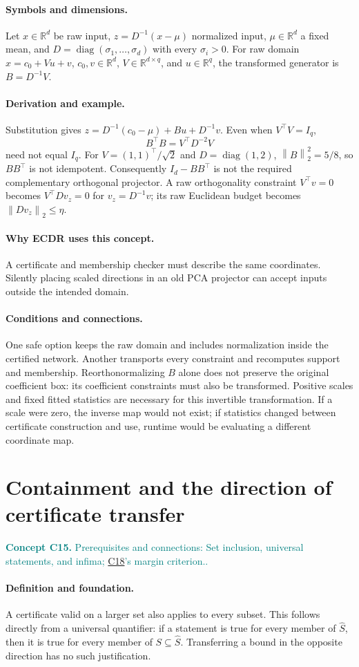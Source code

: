 \documentclass[11pt,a4paper]{article}
\newcommand{\R}{\mathbb R}
\newcommand{\norm}[1]{\left\lVert#1\right\rVert}
\newcommand{\diag}{\operatorname{diag}}
\newcommand{\conceptid}{Front matter}
\newcommand{\concept}[3]{\clearpage\renewcommand{\conceptid}{#1}%
\section{#2}\label{concept:#1}%
\textcolor{teal}{\textbf{Concept #1.} Prerequisites and connections: #3.}\par
\typeout{ECDR-CONCEPT-START #1 PAGE=\thepage}}
\begin{document}
\paragraph{Symbols and dimensions.}
Let $x\in\R^d$ be raw input, $z=D^{-1}(x-\mu)$ normalized input, $\mu\in\R^d$ a fixed mean, and $D=\diag(\sigma_1,\ldots,\sigma_d)$ with every $\sigma_i>0$. For raw domain $x=c_0+Vu+v$, $c_0,v\in\R^d$, $V\in\R^{d\times q}$, and $u\in\R^q$, the transformed generator is $B=D^{-1}V$.
\paragraph{Derivation and example.}
Substitution gives $z=D^{-1}(c_0-\mu)+Bu+D^{-1}v$. Even when $V^\top V=I_q$,
\[
 B^\top B=V^\top D^{-2}V
\]
need not equal $I_q$. For $V=(1,1)^\top/\sqrt2$ and $D=\diag(1,2)$, $\norm{B}_2^2=5/8$, so $BB^\top$ is not idempotent. Consequently $I_d-BB^\top$ is not the required complementary orthogonal projector.
A raw orthogonality constraint $V^\top v=0$ becomes $V^\top Dv_z=0$ for $v_z=D^{-1}v$; its raw Euclidean budget becomes $\norm{Dv_z}_2\le\eta$.
\paragraph{Why ECDR uses this concept.}
A certificate and membership checker must describe the same coordinates. Silently placing scaled directions in an old PCA projector can accept inputs outside the intended domain.
\paragraph{Conditions and connections.}
One safe option keeps the raw domain and includes normalization inside the certified network. Another transports every constraint and recomputes support and membership. Reorthonormalizing $B$ alone does not preserve the original coefficient box: its coefficient constraints must also be transformed. Positive scales and fixed fitted statistics are necessary for this invertible transformation. If a scale were zero, the inverse map would not exist; if statistics changed between certificate construction and use, runtime would be evaluating a different coordinate map.
\par\label{endconcept:C14}

\concept{C15}{Containment and the direction of certificate transfer}{Set inclusion, universal statements, and infima; \hyperref[concept:C18]{C18}'s margin criterion.}
\paragraph{Definition and foundation.}
A certificate valid on a larger set also applies to every subset. This follows directly from a universal quantifier: if a statement is true for every member of $\widehat S$, then it is true for every member of $S\subseteq\widehat S$. Transferring a bound in the opposite direction has no such justification.
\end{document}
